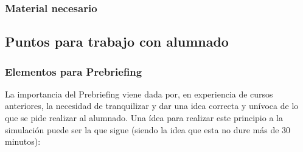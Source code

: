 \subsubsection{Material necesario}
\subsection{Puntos para trabajo con alumnado}
\subsubsection{Elementos para Prebriefing}
La importancia del Prebriefing viene dada por, en experiencia de cursos anteriores, la necesidad de tranquilizar y dar una idea correcta y unívoca de lo que se pide realizar al alumnado. Una ídea para realizar este principio a la simulación puede ser la que sigue (siendo la idea que esta no dure más de 30 minutos):
